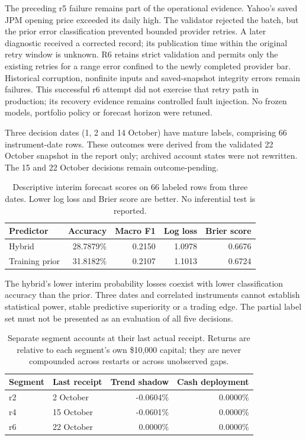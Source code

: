 The preceding r5 failure remains part of the operational evidence. Yahoo's
saved JPM opening price exceeded its daily high. The validator rejected the
batch, but the prior error classification prevented bounded provider retries.
A later diagnostic received a corrected record; its publication time within
the original retry window is unknown. R6 retains strict validation and permits
only the existing retries for a range error confined to the newly completed
provider bar. Historical corruption, nonfinite inputs and saved-snapshot
integrity errors remain failures. This successful r6 attempt did not exercise
that retry path in production; its recovery evidence remains controlled fault
injection. No frozen models, portfolio policy or forecast horizon were retuned.

Three decision dates (1, 2 and 14 October) have mature labels, comprising
66 instrument-date rows. These outcomes were derived from the validated
22 October snapshot in the report only; archived account states were not
rewritten. The 15 and 22 October decisions remain outcome-pending.

\begin{table}[htbp]
\centering\small
\caption{Descriptive interim forecast scores on 66 labeled rows from three
dates. Lower log loss and Brier score are better. No inferential test is reported.}
\label{tab:r6-interim-prediction}
\begin{tabular}{@{}lrrrr@{}}
\toprule
Predictor & Accuracy & Macro F1 & Log loss & Brier score \\
\midrule
Hybrid & 28.7879\% & 0.2150 & 1.0978 & 0.6676 \\
Training prior & 31.8182\% & 0.2107 & 1.1013 & 0.6724 \\
\bottomrule
\end{tabular}
\end{table}

The hybrid's lower interim probability losses coexist with lower classification
accuracy than the prior. Three dates and correlated instruments cannot establish
statistical power, stable predictive superiority or a trading edge. The partial
label set must not be presented as an evaluation of all five decisions.

\begin{table}[htbp]
\centering\small
\caption{Separate segment accounts at their last actual receipt. Returns are
relative to each segment's own \$10,000 capital; they are never compounded
across restarts or across unobserved gaps.}
\label{tab:r6-interim-accounts}
\begin{tabular}{@{}llrr@{}}
\toprule
Segment & Last receipt & Trend shadow & Cash deployment \\
\midrule
r2 & 2 October & -0.0604\% & 0.0000\% \\
r4 & 15 October & -0.0601\% & 0.0000\% \\
r6 & 22 October & 0.0000\% & 0.0000\% \\
\bottomrule
\end{tabular}
\end{table}

